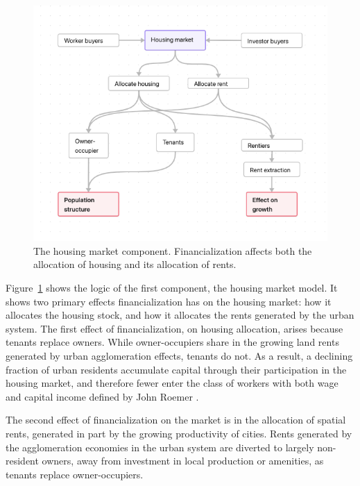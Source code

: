 \begin{figure}[!ht]
\centering
\includegraphics[scale=.60]{fig/flow-impacts.png}
\caption[The housing market component of the model.]{The housing market component. Financialization affects both the allocation of housing and its allocation of rents.}
\label{fig-impacts}
\end{figure}

Figure~\ref{fig-impacts} shows the logic  of the first component, the housing market model.
It shows two primary effects financialization has on the housing market: how it allocates
the housing stock, and how it allocates the \glspl{rent} generated by the urban system. 
The first effect of financialization, on housing allocation, arises because tenants replace owners. While owner-occupiers share in the growing land rents generated by urban agglomeration effects, tenants do not. As a result, a declining fraction of urban residents accumulate capital through their participation in the housing market, and therefore fewer enter the class of workers with both wage and capital income defined by John Roemer \cite{roemerGeneralTheoryExploitation1982}. 

The second effect of financialization on the market is in the allocation of spatial rents, generated in part by the growing productivity of cities. Rents generated by the \gls{agglomeration} economies in the urban system are diverted to largely non-resident owners, away from investment in local production or amenities, as tenants replace owner-occupiers.

